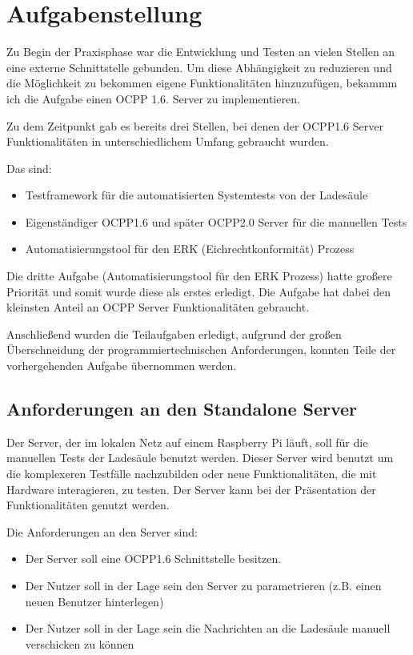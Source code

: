 \section{Aufgabenstellung}
Zu Begin der Praxisphase war die Entwicklung und Testen an vielen Stellen an eine externe Schnittstelle gebunden.
Um diese Abhängigkeit zu reduzieren und die Möglichkeit zu bekommen eigene Funktionalitäten hinzuzufügen, bekammm ich die Aufgabe
einen OCPP 1.6. Server zu implementieren.

Zu dem Zeitpunkt gab es bereits drei Stellen, bei denen der OCPP1.6 Server Funktionalitäten in unterschiedlichem Umfang gebraucht wurden.

Das sind:
\begin{itemize}
    \item Testframework für die automatisierten Systemtests von der Ladesäule
    \item Eigenständiger OCPP1.6 und später OCPP2.0 Server für die manuellen Tests
    \item Automatisierungstool für den ERK (Eichrechtkonformität) Prozess
\end{itemize}

Die dritte Aufgabe (Automatisierungstool für den ERK Prozess) hatte großere Priorität und somit wurde diese als erstes erledigt.
Die Aufgabe hat dabei den kleinsten Anteil an OCPP Server Funktionalitäten gebraucht.

Anschließend wurden die Teilaufgaben erledigt, aufgrund der großen Überschneidung der programmiertechnischen Anforderungen, 
konnten Teile der vorhergehenden Aufgabe übernommen werden.


\subsection{Anforderungen an den Standalone Server}
    Der Server, der im lokalen Netz auf einem Raspberry Pi läuft, soll für die manuellen Tests der Ladesäule benutzt werden.
    Dieser Server wird benutzt um die komplexeren Testfälle nachzubilden oder neue Funktionalitäten, die mit Hardware interagieren, zu testen.
    Der Server kann bei der Präsentation der Funktionalitäten genutzt werden.

    Die Anforderungen an den Server sind:
    \begin{itemize}
        \item Der Server soll eine OCPP1.6 Schnittstelle besitzen.
        \item Der Nutzer soll in der Lage sein den Server zu parametrieren (z.B. einen neuen Benutzer hinterlegen)
        \item Der Nutzer soll in der Lage sein die Nachrichten an die Ladesäule manuell verschicken zu können
    \end{itemize}

